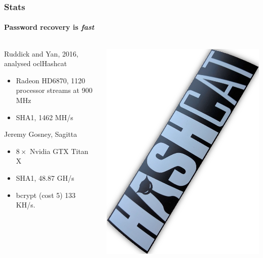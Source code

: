 \documentclass[handout, notes=hide]{beamer}
\begin{document}
\begin{frame}
\frametitle{Stats}
\framesubtitle{Password recovery is {\it fast}}
\setlength{\parskip}{0.5em}

\begin{columns}[T]
\begin{column}[T]{0.6\textwidth}
\setlength{\parskip}{0.5em}
Ruddick and Yan, 2016, analysed oclHashcat
\begin{itemize}
\item Radeon HD6870, 1120 processor streams at 900 MHz
\item SHA1, 1462 MH/s
\end{itemize}

Jeremy Gosney, Sagitta

\begin{itemize}
\item $8 \times$ Nvidia GTX Titan X
\item SHA1, 48.87 GH/s
\item bcrypt (cost 5) 133 KH/s.
\end{itemize}


\end{column}
\begin{column}[T]{0.4\textwidth}
\vspace{0.0em}
\includegraphics[width=1.0\textwidth]{hashcat}
\end{column}
\end{columns}


\end{frame}
\end{document}
